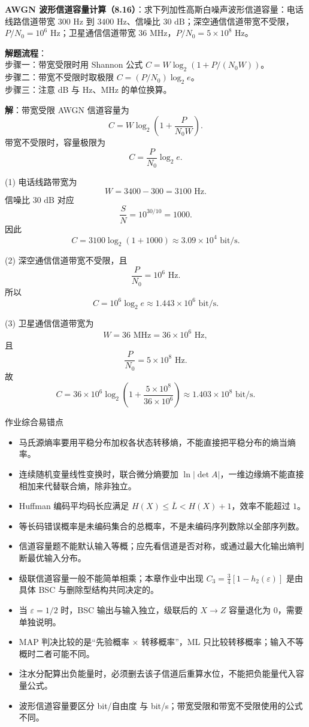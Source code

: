 \begin{example}
\label{hw:ch8-16-awgn-waveform-capacity}
\textbf{AWGN 波形信道容量计算（8.16）}：求下列加性高斯白噪声波形信道容量：电话线路信道带宽 $300\text{ Hz}$ 到 $3400\text{ Hz}$、信噪比 $30\text{ dB}$；深空通信信道带宽不受限，$P/N_0=10^6\text{ Hz}$；卫星通信信道带宽 $36\text{ MHz}$，$P/N_0=5\times10^8\text{ Hz}$。

\noindent \textbf{解题流程}：\\[2pt]
步骤一：带宽受限时用 Shannon 公式 $C=W\log_2(1+P/(N_0W))$。\\
步骤二：带宽不受限时取极限 $C=(P/N_0)\log_2 e$。\\
步骤三：注意 dB 与 Hz、MHz 的单位换算。

\textbf{解}：带宽受限 AWGN 信道容量为
\[
C=W\log_2\left(1+\frac{P}{N_0W}\right).
\]
带宽不受限时，容量极限为
\[
C=\frac{P}{N_0}\log_2 e.
\]

(1) 电话线路带宽为
\[
W=3400-300=3100\text{ Hz}.
\]
信噪比 $30\text{ dB}$ 对应
\[
\frac{S}{N}=10^{30/10}=1000.
\]
因此
\[
C=3100\log_2(1+1000)
\approx3.09\times10^4\text{ bit/s}.
\]

(2) 深空通信信道带宽不受限，且
\[
\frac{P}{N_0}=10^6\text{ Hz}.
\]
所以
\[
C=10^6\log_2e
\approx1.443\times10^6\text{ bit/s}.
\]

(3) 卫星通信信道带宽为
\[
W=36\text{ MHz}=36\times10^6\text{ Hz},
\]
且
\[
\frac{P}{N_0}=5\times10^8\text{ Hz}.
\]
故
\[
C=36\times10^6\log_2\left(1+\frac{5\times10^8}{36\times10^6}\right)
\approx1.403\times10^8\text{ bit/s}.
\]
\end{example}

\begin{warningBox}{作业综合易错点}
\begin{itemize}
  \item 马氏源熵率要用平稳分布加权各状态转移熵，不能直接把平稳分布的熵当熵率。
  \item 连续随机变量线性变换时，联合微分熵要加 $\ln|\det A|$，一维边缘熵不能直接相加来代替联合熵，除非独立。
  \item Huffman 编码平均码长应满足 $H(X)\le\bar L< H(X)+1$，效率不能超过 $1$。
  \item 等长码错误概率是未编码集合的总概率，不是未编码序列数除以全部序列数。
  \item 信道容量题不能默认输入等概；应先看信道是否对称，或通过最大化输出熵判断最优输入分布。
  \item 级联信道容量一般不能简单相乘；本章作业中出现 $C_3=\frac34[1-h_2(\varepsilon)]$ 是由具体 BSC 与删除型结构共同决定的。
  \item 当 $\varepsilon=1/2$ 时，BSC 输出与输入独立，级联后的 $X\to Z$ 容量退化为 $0$，需要单独说明。
  \item MAP 判决比较的是“先验概率 $\times$ 转移概率”，ML 只比较转移概率；输入不等概时二者可能不同。
  \item 注水分配算出负能量时，必须删去该子信道后重算水位，不能把负能量代入容量公式。
  \item 波形信道容量要区分 bit/自由度 与 bit/s；带宽受限和带宽不受限使用的公式不同。
\end{itemize}
\end{warningBox}

